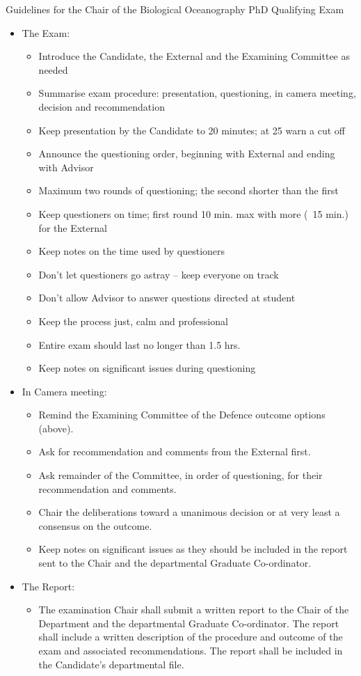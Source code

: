 Guidelines for the Chair of the Biological Oceanography PhD Qualifying Exam
\begin{itemize}
\item The Exam:
\begin{itemize}
\item Introduce the Candidate, the External and the Examining Committee as needed
\item Summarise exam procedure: presentation, questioning, in camera meeting, decision and recommendation
\item Keep presentation by the Candidate to 20 minutes; at 25 warn a cut off
\item Announce the questioning order, beginning with External and ending with Advisor 
\item Maximum two rounds of questioning; the second shorter than the first
\item Keep questioners on time; first round 10 min. max with more (~15 min.) for the External
\item Keep notes on the time used by questioners
\item Don’t let questioners go astray – keep everyone on track
\item Don’t allow Advisor to answer questions directed at student
\item Keep the process just, calm and professional
\item Entire exam should last no longer than 1.5 hrs. 
\item Keep notes on significant issues during questioning
\end{itemize}

\item In Camera meeting:
\begin{itemize}
\item Remind the Examining Committee of the Defence outcome options (above).
\item Ask for recommendation and comments from the External first.
\item Ask remainder of the Committee, in order of questioning, for their recommendation and comments.
\item Chair the deliberations toward a unanimous decision or at very least a consensus on the outcome.
\item Keep notes on significant issues as they should be included in the report sent to the Chair and the departmental Graduate Co-ordinator.
\end{itemize}

\item The Report:
\begin{itemize}
\item The examination Chair shall submit a written report to the Chair of the Department and the departmental Graduate Co-ordinator. The report shall include a written description of the procedure and outcome of the exam and associated recommendations. The report shall be included in the Candidate’s departmental file.
\end{itemize}

\end{itemize}

